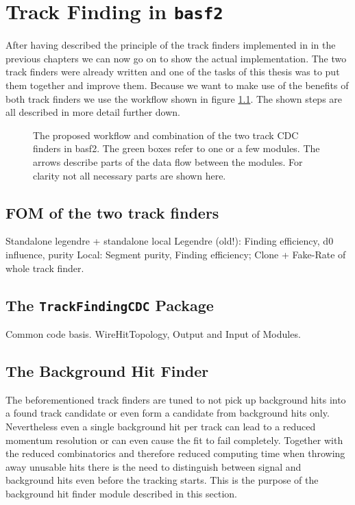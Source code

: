 \chapter{Track Finding in \texttt{basf2}} \label{chapter-workflow}

After having described the principle of the track finders implemented in \basf in the previous chapters we can now go on to show the actual implementation. The two track finders were already written and one of the tasks of this thesis was to put them together and improve them. Because we want to make use of the benefits of both track finders we use the workflow shown in figure \ref{fig-workflow}. The shown steps are all described in more detail further down.

\begin{figure}
 \caption[Proposed workflow in the CDC tracking]{The proposed workflow and combination of the two track CDC finders in basf2. The green boxes refer to one or a few modules. The arrows describe parts of the data flow between the modules. For clarity not all necessary parts are shown here.}
 \label{fig-workflow}
\end{figure}


\section{FOM of the two track finders}

Standalone legendre + standalone local
Legendre (old!): Finding efficiency, d0 influence, purity
Local: Segment purity, Finding efficiency; Clone + Fake-Rate of whole track finder.

\section{The \texttt{TrackFindingCDC} Package}
Common code basis. WireHitTopology, Output and Input of Modules.

\section{The Background Hit Finder}
The beforementioned track finders are tuned to not pick up background hits into a found track candidate or even form a candidate from background hits only. Nevertheless even a single background hit per track can lead to a reduced momentum resolution or can even cause the fit to fail completely. Together with the reduced combinatorics and therefore reduced computing time when throwing away unusable hits there is the need to distinguish between signal and background hits even before the tracking starts. This is the purpose of the background hit finder module described in this section.

